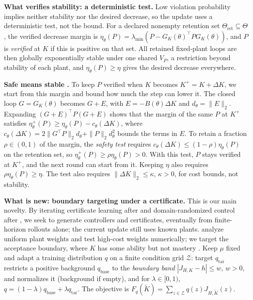 \documentclass{l4dc2026}
\newcommand{\G}{G_K}
\begin{document}
\textbf{What verifies stability: a deterministic test.}
Low violation probability implies neither stability nor the desired decrease, so the
update uses a deterministic test, not the bound. For a declared nonempty retention set
$\Theta_{\mathrm{ret}}\subseteq\Theta$, the verified decrease margin is
$\eta_\theta(P)=\lambda_{\min}(P-\G(\theta)^\top P\G(\theta))$, and $P$ is \emph{verified}
at $K$ if this is positive on that set. All retained fixed-plant loops are then globally
exponentially stable under one shared $V_P$, a restriction beyond stability of each plant, and
$\eta_\theta(P)\ge\eta$ gives the desired decrease everywhere.

\textbf{Safe means stable \citep{berkenkamp2017safe}.}
To keep $P$ verified when $K$ becomes $K^+=K+\Delta K$, we start from this margin and bound
how much the step can lower it. The closed loop $G=\G(\theta)$ becomes $G+E$, with
$E=-B(\theta)\Delta K$ and $d_\theta=\|E\|_2$. Expanding $(G+E)^\top P(G+E)$ shows that the
margin of the same $P$ at $K^+$ satisfies $\eta_\theta^+(P)\ge\eta_\theta(P)-c_\theta(\Delta K)$, where
$c_\theta(\Delta K)=2\|G^\top P\|_2d_\theta+\|P\|_2d_\theta^2$ bounds the terms in $E$. To
retain a fraction $\rho\in(0,1)$ of the margin, the \emph{safety test} requires
$c_\theta(\Delta K)\le(1-\rho)\eta_\theta(P)$ on the retention set, so
$\eta_\theta^+(P)\ge\rho\eta_\theta(P)>0$. With this test, $P$ stays verified at $K^+$,
and the next round can start from it. Keeping $\eta$ also requires $\rho\eta_\theta(P)\ge\eta$. The test also requires $\|\Delta K\|_2\le\kappa$, $\kappa>0$,
for cost bounds, not stability.

\textbf{What is new: boundary targeting under a certificate.}
This is our main novelty. By iterating certificate learning after
\citet{boffi2021learning} and domain-randomized control after
\citet{fujinami2025domain}, we seek to generate controllers and certificates, eventually from
finite-horizon rollouts alone; the current update still uses known plants.
\citeauthor{fujinami2025domain} analyze uniform plant
weights and test high-cost weights numerically; we target the acceptance boundary, where $K$ has
some ability but not mastery \citep{florensa2017reverse,rutherford2024noregrets}. Keep $\mu$ fixed and adapt a
training distribution $q$ on a finite condition grid $\mathcal Z$: target $q_{\mathrm{tar}}$
restricts a positive background $q_{\mathrm{base}}$ to the \emph{boundary band}
$|J_{H,K}-h|\le w$, $w>0$, and normalizes it (background if empty), and for
$\lambda\in[0,1)$, $q=(1-\lambda)q_{\mathrm{base}}+\lambda q_{\mathrm{tar}}$. The objective
is $F_q(\widetilde K)=\sum_{z\in\mathcal Z}q(z)J_{H,\widetilde K}(z)$.
\end{document}
